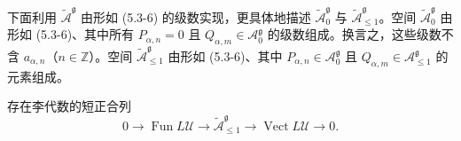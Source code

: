 下面利用 $\widetilde{\mathcal{A}}^{\mathfrak{g}}$ 由形如 (5.3-6) 的级数实现，更具体地描述 $\widetilde{\mathcal{A}}^{\mathfrak{g}}_0$ 与 $\widetilde{\mathcal{A}}^{\mathfrak{g}}_{\le1}$。空间 $\widetilde{\mathcal{A}}^{\mathfrak{g}}_0$ 由形如 (5.3-6)、其中所有 $P_{\alpha,n}=0$ 且 $Q_{\alpha,m}\in\mathcal{A}^{\mathfrak{g}}_0$ 的级数组成。换言之，这些级数不含 $a_{\alpha,n}$（$n\in\mathbb{Z}$）。空间 $\widetilde{\mathcal{A}}^{\mathfrak{g}}_{\le1}$ 由形如 (5.3-6)、其中 $P_{\alpha,n}\in\mathcal{A}^{\mathfrak{g}}_0$ 且 $Q_{\alpha,m}\in\mathcal{A}^{\mathfrak{g}}_{\le1}$ 的元素组成。

\begin{proposition}
    存在李代数的短正合列
    \begin{equation}
        0\to\operatorname{Fun}L\mathcal{U}\to\widetilde{\mathcal{A}}^{\mathfrak{g}}_{\le1}
        \to\operatorname{Vect}L\mathcal{U}\to0.
        \tag{5.3-7}
    \end{equation}
\end{proposition}


